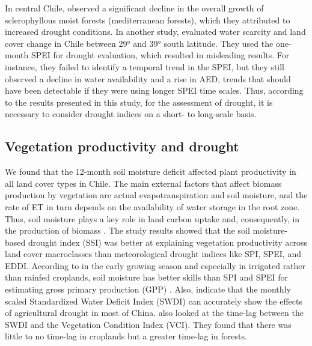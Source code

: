 \documentclass[
  authoryear,
  preprint,
  3p,
  onecolumn]{elsarticle}
\begin{document}
In central Chile, \citet{Venegas2022} observed a significant decline in
the overall growth of sclerophyllous moist forests (mediterranean
forests), which they attributed to increased drought conditions. In
another study, \citet{Fuentes2021} evaluated water scarcity and land
cover change in Chile between 29° and 39° south latitude. They used the
one-month SPEI for drought evaluation, which resulted in misleading
results. For instance, they failed to identify a temporal trend in the
SPEI, but they still observed a decline in water availability and a rise
in AED, trends that should have been detectable if they were using
longer SPEI time scales. Thus, according to the results presented in
this study, for the assessment of drought, it is necessary to consider
drought indices on a short- to long-scale basis.

\hypertarget{vegetation-productivity-and-drought}{%
\subsection{Vegetation productivity and
drought}\label{vegetation-productivity-and-drought}}

We found that the 12-month soil moisture deficit affected plant
productivity in all land cover types in Chile. The main external factors
that affect biomass production by vegetation are actual
evapotranspiration and soil moisture, and the rate of ET in turn depends
on the availability of water storage in the root zone. Thus, soil
moisture plays a key role in land carbon uptake and, consequently, in
the production of biomass \citep{Humphrey2021}. The study results showed
that the soil moisture-based drought index (SSI) was better at
explaining vegetation productivity across land cover macroclasses than
meteorological drought indices like SPI, SPEI, and EDDI. According to
\citep{Chatterjee2022} in the early growing season and especially in
irrigated rather than rainfed croplands, soil moisture has better skills
than SPI and SPEI for estimating gross primary production (GPP) . Also,
\citet{Zhou2021} indicate that the monthly scaled Standardized Water
Deficit Index (SWDI) can accurately show the effects of agricultural
drought in most of China. \citet{Nicolai2017} also looked at the
time-lag between the SWDI and the Vegetation Condition Index (VCI). They
found that there was little to no time-lag in croplands but a greater
time-lag in forests.
\end{document}
